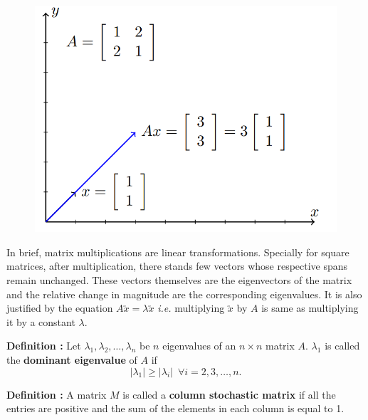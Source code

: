 \documentclass[11pt, a4paper]{article}
\begin{document}
\begin{figure}[!htbp]

\centering

\includegraphics[scale=0.5]{image_2.png}

\end{figure}

In brief, matrix multiplications are linear transformations. Specially for square matrices, after multiplication, there stands few vectors whose respective spans remain unchanged. These vectors themselves are the eigenvectors of the matrix and the relative change in magnitude are the corresponding eigenvalues. It is also justified by the equation $A \utilde{x} = \lambda \utilde{x}$ \textit{i.e.} multiplying $\utilde{x}$ by $A$ is same as multiplying it by a constant $\lambda$. \\

\vspace{0.3cm}

\leftpointright \hspace{0.3cm} \textbf{Definition : } Let $\lambda_1, \lambda_2, \ldots, \lambda_n$ be $n$ eigenvalues of an $n \times n$ matrix $A$. $\lambda_1$ is called the \textbf{dominant eigenvalue} of $A$ if $$|\lambda_1| \geq |\lambda_i| \,\,\, \forall i = 2, 3, \ldots, n.$$

\leftpointright \hspace{0.3cm} \textbf{Definition : } A matrix $M$ is called a \textbf{column stochastic matrix} if all the entries are positive and the sum of the elements in each column is equal to 1. \\
\end{document}
